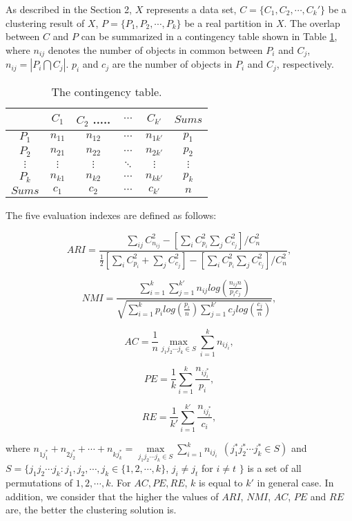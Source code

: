 \documentclass[review]{elsarticle}
\begin{document}
As described in the Section 2, $X$ represents a data set, $C=\{C_1,C_2,\cdots,C_k'\}$ be a clustering result of $X$, $P=\{P_1,P_2,\cdots,P_k\}$ be a real partition in $X$. The overlap between $C$ and $P$ can be summarized in a contingency table shown in Table \ref{tab-cont}, where $n_{ij}$ denotes the number of objects in common between $P_i$ and $C_j$, $n_{ij}=|P_i \bigcap C_j|$. $p_i$ and $c_j$ are the number of objects in $P_i$ and $C_j$, respectively.
\begin{table}[!h]
\centering

\caption{The contingency table.}
\label{tab-cont}
\begin{tabular}{cccccc}
\hline\noalign{\smallskip}
  &  $C_1$ & $C_2$ .....& $\cdots$ & $C_{k'}$ & $Sums$\\
\hline
$P_1$ & $n_{11}$ & $n_{12}$ &  $\cdots$ & $n_{1k'}$  & $p_1$\\

$P_2$     & $n_{21}$ & $n_{22}$ &  $\cdots$ & $n_{2k'}$  & $p_2$\\

$\vdots$  & $\vdots$ & $\vdots$ &  $\ddots$ & $\vdots$  & $\vdots$\\

$P_k$  & $n_{k1}$ & $n_{k2}$ & $\cdots$ & $n_{kk'}$  & $p_{k}$\\

$Sums$      & $c_1$     &  $c_2$    & $\cdots$ & $c_{k'}$  & $n$ \\

\hline
\end{tabular}
\end{table}

The five evaluation indexes are defined as follows:

$$ARI=\frac{\sum_{ij}C_{n_{ij}}^{2}-[\sum_i C_{p_i}^2 \sum_j  C_{c_j}^2]/C_n^2}
{\frac{1}{2}[\sum_i C_{p_i}^2+\sum_j C_{c_j}^2]-[\sum_iC_{p_i}^2 \sum_j C_{c_j}^2]/C_n^2},$$

$$NMI=\frac{\sum_{i=1}^k\sum_{j=1}^{k'}n_{ij}log(\frac{n_{ij}n}{p_{i}c_{j}})}
         {\sqrt{\sum_{i=1}^{k}p_{i}log(\frac{p_i}{n})\sum_{j=1}^{k'}c_{j}log(\frac{c_j}{n})}},$$

$$AC=\frac{1}{n}\max\limits_{j_1 j_2 \cdots j_k \in S}\sum_{i=1}^{k}n_{ij_i},$$

$$PE=\frac{1}{k}\sum_{i=1}^{k}\frac{n_{ij_i^*}}{p_i},$$

$$RE=\frac{1}{k'}\sum_{i=1}^{k'}\frac{n_{ij_i^*}}{c_{i}},$$

where  $n_{1j_1^*}+n_{2j_2^*}+\cdots+n_{kj_k^*}=\max\limits_{j_1 j_2 \cdots j_k \in S}\sum_{i=1}^{k}n_{ij_i}\ \ (j_1^* j_2^* \cdots j_k^* \in S)$ and $S=\{j_1j_2 \cdots j_k: j_1,j_2, \cdots, j_k \in \{1,2,\cdots,k\}$, $j_i\neq j_t$ for $i\neq t$ $\}$ is a set of all permutations of $1,2,\cdots,k$. For $AC, PE, RE$, $k$ is equal to $k'$ in general case. In addition, we consider that the higher the values of $ARI$, $NMI$, $AC$, $PE$ and $RE$ are, the better the clustering solution is.
\end{document}
